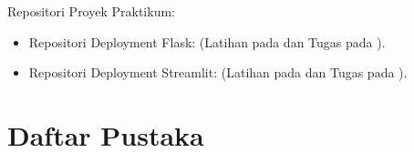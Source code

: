 \documentclass[a4paper,oneside,11pt]{book}
\begin{document}
\par Repositori Proyek Praktikum:
\begin{itemize}
  \item Repositori Deployment Flask:  (Latihan pada  dan Tugas pada ).
  \item Repositori Deployment Streamlit:  (Latihan pada  dan Tugas pada ).
\end{itemize}

\section{Daftar Pustaka}
\printbibliography[heading=none]
\end{document}
